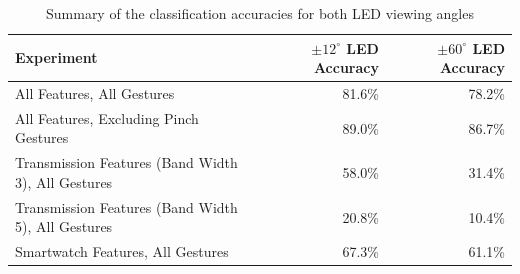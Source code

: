 \documentclass[ oneside,%
                    author={Jack Jarvis},
                    degree={BSc},
                     title={FlexIR: Flexible PCB Wristbands for Infrared Based Gesture Recognition},
                    unit={COMS30045},
                    subtitle={Investigating the Effect of LED Viewing Angle on Gesture Classification in Infrared Sensing Systems}]{dissertation}
\begin{document}
\begin{table}[htp]
    \centering
    \begin{tabular}{lrr}
        \toprule
        Experiment & $\pm 12^\circ$ LED Accuracy & $\pm 60^\circ$ LED Accuracy \\
        \midrule
        All Features, All Gestures & 81.6\% & 78.2\% \\
        All Features, Excluding Pinch Gestures & 89.0\% & 86.7\% \\
        Transmission Features (Band Width 3), All Gestures & 58.0\% & 31.4\% \\
        Transmission Features (Band Width 5), All Gestures & 20.8\% & 10.4\% \\
        Smartwatch Features, All Gestures & 67.3\% & 61.1\% \\
        \bottomrule
    \end{tabular}
    \caption{Summary of the classification accuracies for both LED viewing angles}
    \label{tab:acc_summary}
\end{table}
\end{document}
